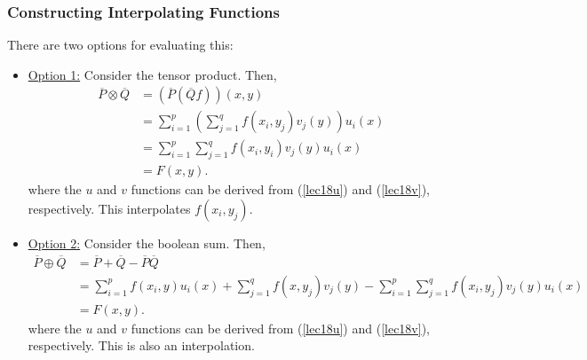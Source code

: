 \documentclass[letterpaper]{article}
\begin{document}
\subsubsection{Constructing Interpolating Functions}
There are two options for evaluating this: 
\begin{itemize}
    \item \underline{Option 1:} Consider the tensor product. Then,
    \begin{equation*}
        \begin{aligned}
            \overline{P} \otimes \overline{Q} &= (\overline{P} (\overline{Q} f))(x, y) \\
                &= \sum_{i = 1}^{p} \left( \sum_{j = 1}^{q} f(x_{i}, y_{j}) v_{j}(y) \right) u_{i}(x) \\
                &= \sum_{i = 1}^{p} \sum_{j = 1}^{q} f(x_{i}, y_{i}) v_{j}(y) u_{i}(x) \\
                &= F(x, y).
        \end{aligned}
    \end{equation*}
    where the $u$ and $v$ functions can be derived from (\ref{lec18u}) and (\ref{lec18v}), respectively. This interpolates $f(x_{i}, y_{j}).$

    \item \underline{Option 2:} Consider the boolean sum. Then,  
    \begin{equation*}
        \begin{aligned}
            \overline{P} \oplus \overline{Q} &= \overline{P} + \overline{Q} - \overline{P}\overline{Q} \\
                &= \sum_{i = 1}^{p} f(x_{i}, y) u_{i}(x) + \sum_{j = 1}^{q} f(x, y_{j}) v_{j}(y) - \sum_{i = 1}^{p} \sum_{j = 1}^{q} f(x_{i}, y_{j}) v_{j}(y) u_{i}(x) \\ 
                    &= F(x, y).
        \end{aligned}
    \end{equation*}
    where the $u$ and $v$ functions can be derived from (\ref{lec18u}) and (\ref{lec18v}), respectively. This is also an interpolation. 
\end{itemize}
\end{document}
